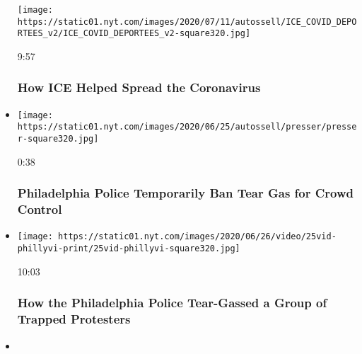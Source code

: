 \begin{itemize}
  \texttt{[image: https://static01.nyt.com/images/2020/07/11/autossell/ICE\_COVID\_DEPORTEES\_v2/ICE\_COVID\_DEPORTEES\_v2-square320.jpg]}

  9:57

  \hypertarget{how-ice-helped-spread-the-coronavirus}{%
  \subsubsection{How ICE Helped Spread the
  Coronavirus}\label{how-ice-helped-spread-the-coronavirus}}
\item
  \href{https://www.nytimes.com/video/us/100000007210395/philadelphia-police-ban-tear-gas.html?action=click\&module=video-series-bar\&region=header\&pgtype=Article\&playlistId=video/investigations}{}

  \texttt{[image: https://static01.nyt.com/images/2020/06/25/autossell/presser/presser-square320.jpg]}

  0:38

  \hypertarget{philadelphia-police-temporarily-ban-tear-gas-for-crowd-control}{%
  \subsubsection{Philadelphia Police Temporarily Ban Tear Gas for Crowd
  Control}\label{philadelphia-police-temporarily-ban-tear-gas-for-crowd-control}}
\item
  \href{https://www.nytimes.com/video/us/100000007174941/philadelphia-tear-gas-george-floyd-protests.html?action=click\&module=video-series-bar\&region=header\&pgtype=Article\&playlistId=video/investigations}{}

  \texttt{[image: https://static01.nyt.com/images/2020/06/26/video/25vid-phillyvi-print/25vid-phillyvi-square320.jpg]}

  10:03

  \hypertarget{how-the-philadelphia-police-tear-gassed-a-group-of-trapped-protesters}{%
  \subsubsection{How the Philadelphia Police Tear-Gassed a Group of
  Trapped
  Protesters}\label{how-the-philadelphia-police-tear-gassed-a-group-of-trapped-protesters}}
\item
  \href{https://www.nytimes.com/video/us/100000007198581/rayshard-brooks-killing-garrett-rolfe.html?action=click\&module=video-series-bar\&region=header\&pgtype=Article\&playlistId=video/investigations}{}


\end{itemize}
